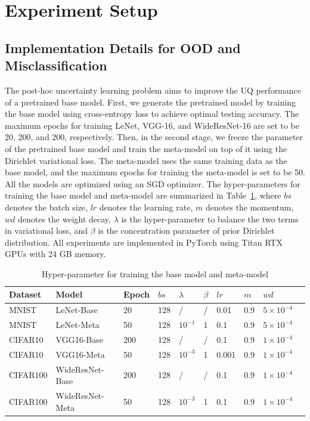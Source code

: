 \newpage
\section{Experiment Setup} \label{setup-appendix}
\subsection{Implementation Details for OOD and Misclassification}
The post-hoc uncertainty learning problem aims to improve the UQ performance of a pretrained base model. First, we generate the pretrained model by training the base model using cross-entropy loss to achieve optimal testing accuracy. The maximum epochs for training LeNet, VGG-16, and WideResNet-16 are set to be 20, 200, and 200, respectively. Then, in the second stage, we freeze the parameter of the pretrained base model and train the meta-model on top of it using the Dirichlet variational loss. The meta-model uses the same training data as the base model, and the maximum epochs for training the meta-model is set to be 50. All the models are optimized using an SGD optimizer. The hyper-parameters for training the base model and meta-model are summarized in Table~\ref{table: hyper}, where $bs$ denotes the batch size, $lr$ denotes the learning rate, $m$ denotes the momentum, $wd$ denotes the weight decay, $\lambda$ is the hyper-parameter to balance the two terms in variational loss, and $\beta$ is the concentration parameter of prior Dirichlet distribution. All experiments are implemented in PyTorch using Titan RTX GPUs with 24 GB memory.
\begin{table}[t]
  \caption{Hyper-parameter for training the base model and meta-model}
  \centering
  \begin{tabular}{llllllllll}
    \toprule
    Dataset & Model & Epoch & $bs$ & $\lambda$ & $\beta$ & $lr$ & $m$ & $wd$\\
    \midrule
    MNIST & LeNet-Base & 20 & 128 & / & / & 0.01 & 0.9 & $5\times10^{-4}$ \\
    \midrule
    MNIST & LeNet-Meta & 50 & 128 & $10^{-1}$ & 1 & 0.1 & 0.9 & $5\times10^{-4}$ \\
    \midrule
    CIFAR10 & VGG16-Base & 200 & 128 & / & / & 0.1 & 0.9 & $1\times10^{-4}$ \\
    \midrule
    CIFAR10 & VGG16-Meta & 50 & 128 & $10^{-3}$ & 1 & 0.001 & 0.9 & $1\times10^{-4}$ \\
    \midrule
    CIFAR100 & WideResNet-Base & 200 & 128 & / & / & 0.1 & 0.9 & $1\times10^{-4}$ \\
    \midrule
    CIFAR100 & WideResNet-Meta & 50 & 128 & $10^{-3}$ & 1 & 0.1 & 0.9 & $1\times10^{-4}$ \\
    \bottomrule
  \end{tabular}
  \label{table: hyper}
\end{table}
